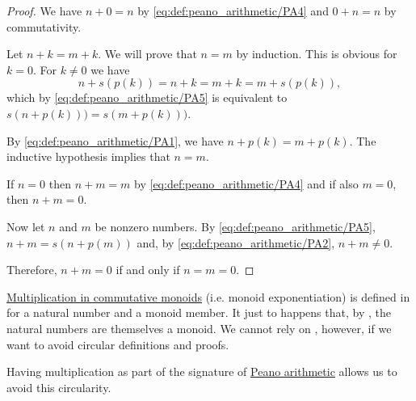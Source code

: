 \begin{proof}
   We have \( n + 0 = n \) by \eqref{eq:def:peano_arithmetic/PA4} and \( 0 + n = n \) by commutativity.

   Let \( n + k = m + k \). We will prove that \( n = m \) by induction. This is obvious for \( k = 0 \). For \( k \neq 0 \) we have
  \begin{equation*}
    n + s(p(k))
    =
    n + k
    =
    m + k
    =
    m + s(p(k)),
  \end{equation*}
  which by \eqref{eq:def:peano_arithmetic/PA5} is equivalent to \( s(n + p(k))) = s(m + p(k))) \).

  By \eqref{eq:def:peano_arithmetic/PA1}, we have \( n + p(k) = m + p(k) \). The inductive hypothesis implies that \( n = m \).

   If \( n = 0 \) then \( n + m = m \) by \eqref{eq:def:peano_arithmetic/PA4} and if also \( m = 0 \), then \( n + m = 0 \).

  Now let \( n \) and \( m \) be nonzero numbers. By \eqref{eq:def:peano_arithmetic/PA5}, \( n + m = s(n + p(m)) \) and, by \eqref{eq:def:peano_arithmetic/PA2}, \( n + m \neq 0 \).

  Therefore, \( n + m = 0 \) if and only if \( n = m = 0 \).
\end{proof}

\begin{remark}\label{rem:natural_number_multiplication}
  \hyperref[rem:additive_magma/multiplication]{Multiplication in commutative monoids} (i.e. monoid exponentiation) is defined in  for a natural number and a monoid member. It just to happens that, by , the natural numbers are themselves a monoid. We cannot rely on , however, if we want to avoid circular definitions and proofs.

  Having multiplication as part of the signature of \hyperref[def:peano_arithmetic]{Peano arithmetic} allows us to avoid this circularity.
\end{remark}

